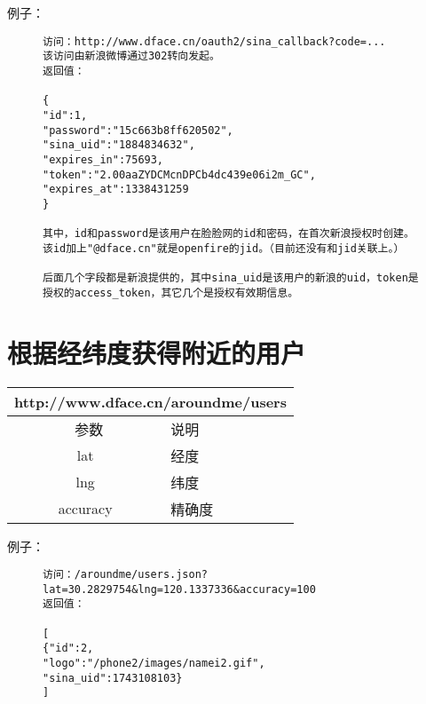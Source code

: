 \documentclass[cs4size]{ctexartutf8}
\begin{document}
例子：

\begin{figure}[H]
\begin{verbatim}
访问：http://www.dface.cn/oauth2/sina_callback?code=...
该访问由新浪微博通过302转向发起。
返回值：

{
"id":1,
"password":"15c663b8ff620502",
"sina_uid":"1884834632",
"expires_in":75693,
"token":"2.00aaZYDCMcnDPCb4dc439e06i2m_GC",
"expires_at":1338431259
}

其中，id和password是该用户在脸脸网的id和密码，在首次新浪授权时创建。该id加上"@dface.cn"就是openfire的jid。（目前还没有和jid关联上。）

后面几个字段都是新浪提供的，其中sina_uid是该用户的新浪的uid，token是授权的access_token，其它几个是授权有效期信息。

\end{verbatim}
\end{figure}




\section{根据经纬度获得附近的用户}

\begin{table}[H]
   \begin{center}
\begin{tabular}{|c|p{12cm}|}
\hline
\multicolumn{2}{|c|}{http://www.dface.cn/aroundme/users} \\
\hline\hline
 \  参数  &  说明  \\
\hline
 lat  &  经度\\
\hline
 lng  &  纬度\\ 
\hline
 accuracy  &  精确度\\ 
\hline
\end{tabular}
   \end{center}
\end{table}


例子：

\begin{figure}[H]
\begin{verbatim}
访问：/aroundme/users.json?lat=30.2829754&lng=120.1337336&accuracy=100
返回值：

[
{"id":2,
"logo":"/phone2/images/namei2.gif",
"sina_uid":1743108103}
]

\end{verbatim}
\end{figure}


\newpage
\end{document}
